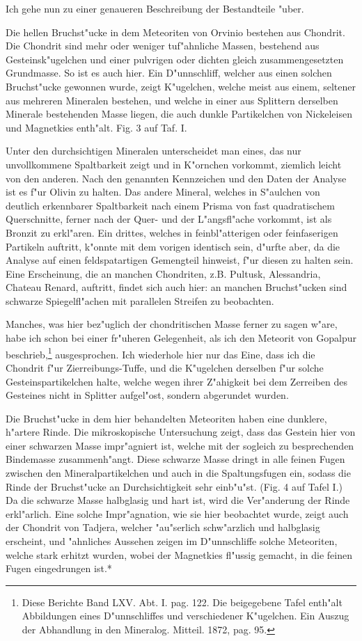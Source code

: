 \documentclass[a4paper, 11pt, oneside]{article}
\begin{document}
Ich gehe nun zu einer genaueren Beschreibung der Bestandteile "uber.

Die hellen Bruchst"ucke in dem Meteoriten von Orvinio bestehen aus Chondrit. Die Chondrit sind mehr oder weniger tuf"ahnliche Massen, bestehend aus Gesteinsk"ugelchen und einer pulvrigen oder dichten gleich zusammengesetzten Grundmasse. So ist es auch hier. Ein D"unnschliff, welcher aus einen solchen Bruchst"ucke gewonnen wurde, zeigt K"ugelchen, welche meist aus einem, seltener aus mehreren Mineralen bestehen, und welche in einer aus Splittern derselben Minerale bestehenden Masse liegen, die auch dunkle Partikelchen von Nickeleisen und Magnetkies enth"alt. Fig. 3 auf Taf. I.

Unter den durchsichtigen Mineralen unterscheidet man eines, das nur unvollkommene Spaltbarkeit zeigt und in K"ornchen vorkommt, ziemlich leicht von den anderen. Nach den genannten Kennzeichen und den Daten der Analyse ist es f"ur Olivin zu halten. Das andere Mineral, welches in S"aulchen von deutlich erkennbarer Spaltbarkeit nach einem Prisma von fast quadratischem Querschnitte, ferner nach der Quer- und der L"angsfl"ache vorkommt, ist als Bronzit zu erkl"aren. Ein drittes, welches in feinbl"atterigen oder feinfaserigen Partikeln auftritt, k"onnte mit dem vorigen identisch sein, d"urfte aber, da die Analyse auf einen feldspatartigen Gemengteil hinweist, f"ur diesen zu halten sein. Eine Erscheinung, die an manchen Chondriten, z.B. Pultusk, Alessandria, Chateau Renard, auftritt, findet sich auch hier: an manchen Bruchst"ucken sind schwarze Spiegelfl"achen mit parallelen Streifen zu beobachten.

Manches, was hier bez"uglich der chondritischen Masse ferner zu sagen w"are, habe ich schon bei einer fr"uheren Gelegenheit, als ich den Meteorit von Gopalpur beschrieb,\footnote{Diese Berichte Band LXV. Abt. I. pag. 122. Die beigegebene Tafel enth"alt Abbildungen eines D"unnschliffes und verschiedener K"ugelchen. Ein Auszug der Abhandlung in den Mineralog. Mitteil. 1872, pag. 95.} ausgesprochen. Ich wiederhole hier nur das Eine, dass ich die Chondrit f"ur Zierreibungs-Tuffe, und die K"ugelchen derselben f"ur solche Gesteinspartikelchen halte, welche wegen ihrer Z"ahigkeit bei dem Zerreiben des Gesteines nicht in Splitter aufgel"ost, sondern abgerundet wurden.

Die Bruchst"ucke in dem hier behandelten Meteoriten haben eine dunklere, h"artere Rinde. Die mikroskopische Untersuchung zeigt, dass das Gestein hier von einer schwarzen Masse impr"agniert ist, welche mit der sogleich zu besprechenden Bindemasse zusammenh"angt. Diese schwarze Masse dringt in alle feinen Fugen zwischen den Mineralpartikelchen und auch in die Spaltungsfugen ein, sodass die Rinde der Bruchst"ucke an Durchsichtigkeit sehr einb"u"st. (Fig. 4 auf Tafel I.) Da die schwarze Masse halbglasig und hart ist, wird die Ver"anderung der Rinde erkl"arlich. Eine solche Impr"agnation, wie sie hier beobachtet wurde, zeigt auch der Chondrit von Tadjera, welcher "au"serlich schw"arzlich und halbglasig erscheint, und "ahnliches Aussehen zeigen im D"unnschliffe solche Meteoriten, welche stark erhitzt wurden, wobei der Magnetkies fl"ussig gemacht, in die feinen Fugen eingedrungen ist.*
\end{document}
